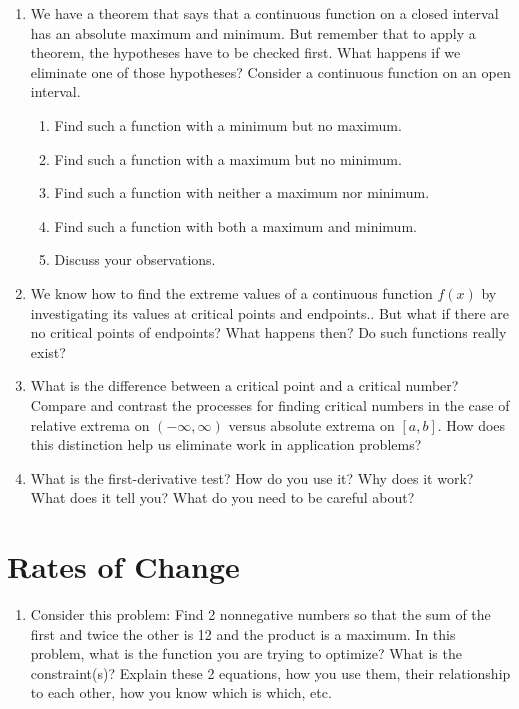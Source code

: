 \begin{enumerate}
\item  We have a theorem that says that a continuous function on a closed interval has an absolute maximum and minimum.  But remember that to apply a theorem, the hypotheses have to be checked first.  What happens if we eliminate one of those hypotheses?  Consider a continuous function on an open interval.
\begin{enumerate}
	\item  Find such a function with a minimum but no maximum.
	\item Find such a function with a maximum but no minimum.
	\item Find such a function with neither a maximum nor minimum.
	\item Find such a function with both a maximum and minimum.  \cite{SBS}
	\item Discuss your observations. 
\end{enumerate}

\item  We know how to find the extreme values of a continuous function $f(x)$ by investigating its values at critical points and endpoints..  But what if there are no critical points of endpoints?  What happens then?  Do such functions really exist?  \cite{FWG}

\item  What is the difference between a critical point and a critical number?  Compare and contrast the processes for finding critical numbers in the case of relative extrema on 
$(-\infty, \infty)$ versus absolute extrema on $[a, b]$.  How does this distinction help us eliminate work in application problems?

\item  What is the first-derivative test?  How do you use it?  Why does it work?  What does it tell you?  What do you need to be careful about?\end{enumerate}\section{Rates of Change}\begin{enumerate}

\item  Consider this problem: Find 2 nonnegative numbers so that the sum of the first and twice the other is 12 and the product is a maximum.  In this problem, what is the function you are trying to optimize?  What is the constraint(s)?  Explain these 2 equations, how you use them, their relationship to each other, how you know which is which, etc.


\end{enumerate}
